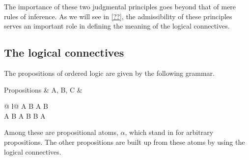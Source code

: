 The importance of these two judgmental principles goes beyond that of mere rules of inference.
As we will see in \cref{??}, the admissibility of these principles serves an important role in defining the meaning of the logical connectives.



\subsection{The logical connectives}

The propositions of ordered logic are given by the following grammar.
\begin{syntax*}
  Propositions & A, B, C &
    \alpha
    \begin{array}[t]{@{{} \mid {}}l@{}}
      A \fuse B \mid \one \mid A \plus B \mid \zero \\
      A \with B \mid \top \mid A \limp B \mid B \pmir A
    \end{array}
\end{syntax*}
Among these are propositional atoms, $\alpha$, which stand in for arbitrary propositions.
The other propositions are built up from these atoms by using the logical connectives.

